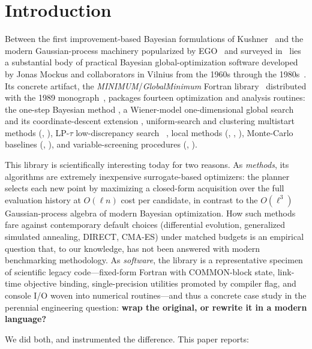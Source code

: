 
\section{Introduction}
\label{sec:intro}

Between the first improvement-based Bayesian formulations of
Kushner~\cite{kushner1964new} and the modern Gaussian-process machinery
popularized by EGO~\cite{jones1998efficient} and surveyed
in~\cite{shahriari2016taking,frazier2018tutorial} lies a substantial body
of practical Bayesian global-optimization software developed by Jonas
Mockus and collaborators in Vilnius from the 1960s through the
1980s~\cite{mockus1978application,mockus1989bayesian}. Its concrete
artifact, the \emph{MINIMUM}/\emph{GlobalMinimum} Fortran
library~\cite{globalminimumfortran} distributed with the 1989
monograph~\cite{mockus1989bayesian}, packages fourteen optimization and
analysis routines: the one-step Bayesian method , a
Wiener-model one-dimensional global search  and its
coordinate-descent extension , uniform-search and clustering
multistart methods (, ), LP-$\tau$ low-discrepancy
search ~\cite{sobol1967distribution}, local methods
(, , ), Monte-Carlo baselines
(, ), and variable-screening procedures
(, ).

This library is scientifically interesting today for two reasons. As
\emph{methods}, its algorithms are extremely inexpensive
surrogate-based optimizers: the  planner selects each new
point by maximizing a closed-form acquisition over the full evaluation
history at $O(\ell n)$ cost per candidate, in contrast to the $O(\ell^3)$
Gaussian-process algebra of modern Bayesian optimization. How such methods
fare against contemporary default choices (differential evolution,
generalized simulated annealing, DIRECT, CMA-ES) under matched budgets is
an empirical question that, to our knowledge, has not been answered with
modern benchmarking methodology. As \emph{software}, the library is a
representative specimen of scientific legacy code---fixed-form Fortran with
COMMON-block state, link-time objective binding, single-precision
utilities promoted by compiler flag, and console I/O woven into numerical
routines---and thus a concrete case study in the perennial engineering
question: \textbf{wrap the original, or rewrite it in a modern language?}

We did both, and instrumented the difference. This paper reports:

